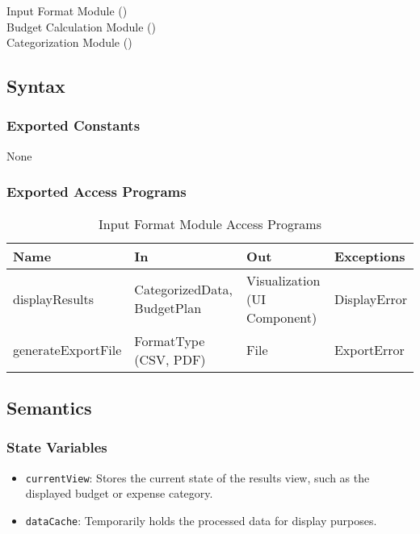 \documentclass[12pt, titlepage]{article}
\begin{document}
Input Format Module ()\\
Budget Calculation Module ()\\
Categorization Module ()\\

\subsection{Syntax}

\subsubsection{Exported Constants}

None

\subsubsection{Exported Access Programs}

\begin{center}
  \begin{table}[H]
    \caption{Input Format Module Access Programs}
\begin{tabular}{p{4cm} p{4cm} p{4cm} p{4cm}}
\hline
\textbf{Name} & \textbf{In} & \textbf{Out} & \textbf{Exceptions} \\
\hline
displayResults & CategorizedData, BudgetPlan & Visualization (UI Component) & DisplayError \\
\hline
generateExportFile & FormatType (CSV, PDF) & File & ExportError \\
\hline
\end{tabular}
\end{table}
\end{center}

\subsection{Semantics}

\subsubsection{State Variables}

\begin{itemize}
    \item \texttt{currentView}: Stores the current state of the results view, such as the displayed budget or expense category.
    \item \texttt{dataCache}: Temporarily holds the processed data for display purposes.
\end{itemize}
\end{document}
